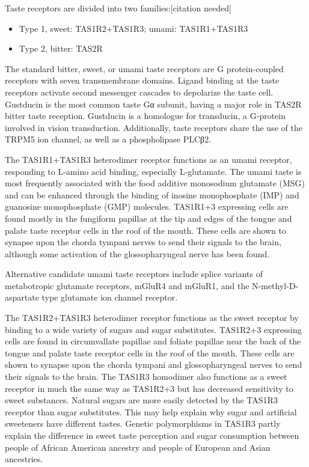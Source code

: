 Taste receptors are divided into two families:{[}citation needed{]}

\begin{itemize}
\tightlist
\item
  Type 1, sweet: TAS1R2+TAS1R3; umami: TAS1R1+TAS1R3
\item
  Type 2, bitter: TAS2R
\end{itemize}

The standard bitter, sweet, or umami taste receptors are G protein-coupled receptors with seven transmembrane domains. Ligand binding at the taste receptors activate second messenger cascades to depolarize the taste cell. Gustducin is the most common taste Gα subunit, having a major role in TAS2R bitter taste reception. Gustducin is a homologue for transducin, a G-protein involved in vision transduction. Additionally, taste receptors share the use of the TRPM5 ion channel, as well as a phospholipase PLCβ2.

The TAS1R1+TAS1R3 heterodimer receptor functions as an umami receptor, responding to L-amino acid binding, especially L-glutamate. The umami taste is most frequently associated with the food additive monosodium glutamate (MSG) and can be enhanced through the binding of inosine monophosphate (IMP) and guanosine monophosphate (GMP) molecules. TAS1R1+3 expressing cells are found mostly in the fungiform papillae at the tip and edges of the tongue and palate taste receptor cells in the roof of the mouth. These cells are shown to synapse upon the chorda tympani nerves to send their signals to the brain, although some activation of the glossopharyngeal nerve has been found.

Alternative candidate umami taste receptors include splice variants of metabotropic glutamate receptors, mGluR4 and mGluR1, and the N-methyl-D-aspartate type glutamate ion channel receptor.

The TAS1R2+TAS1R3 heterodimer receptor functions as the sweet receptor by binding to a wide variety of sugars and sugar substitutes. TAS1R2+3 expressing cells are found in circumvallate papillae and foliate papillae near the back of the tongue and palate taste receptor cells in the roof of the mouth. These cells are shown to synapse upon the chorda tympani and glossopharyngeal nerves to send their signals to the brain. The TAS1R3 homodimer also functions as a sweet receptor in much the same way as TAS1R2+3 but has decreased sensitivity to sweet substances. Natural sugars are more easily detected by the TAS1R3 receptor than sugar substitutes. This may help explain why sugar and artificial sweeteners have different tastes. Genetic polymorphisms in TAS1R3 partly explain the difference in sweet taste perception and sugar consumption between people of African American ancestry and people of European and Asian ancestries.

